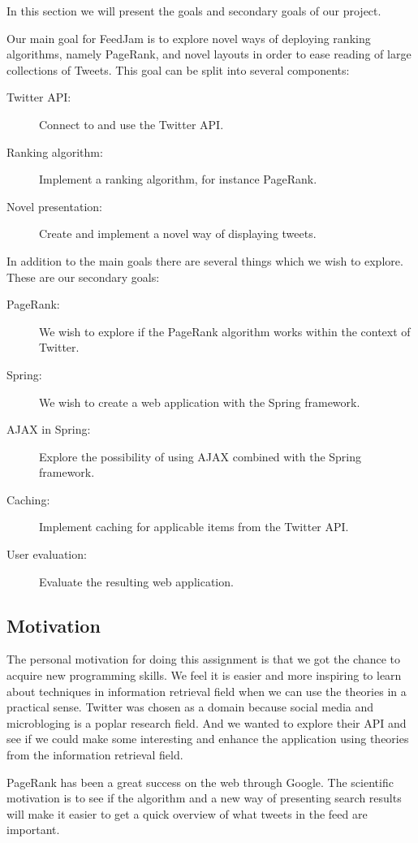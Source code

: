 In this section we will present the goals and secondary goals of our project.

Our main goal for FeedJam is to explore novel ways of deploying ranking algorithms, namely PageRank, and novel layouts in order to ease reading of large collections of Tweets. This goal can be split into several components:

\begin{description}
  \item[Twitter API:] Connect to and use the Twitter API.
  \item[Ranking algorithm:] Implement a ranking algorithm, for instance PageRank.
  \item[Novel presentation:] Create and implement a novel way of displaying tweets.
\end{description}

In addition to the main goals there are several things which we wish to explore. These are our secondary goals:

\begin{description}
  \item[PageRank:] We wish to explore if the PageRank algorithm works within the context of Twitter.
  \item[Spring:] We wish to create a web application with the Spring framework.
  \item[AJAX in Spring:] Explore the possibility of using AJAX combined with the Spring framework.
  \item[Caching:] Implement caching for applicable items from the Twitter API.
  \item[User evaluation:] Evaluate the resulting web application.
\end{description}

\subsection{Motivation} %
The personal motivation for doing this assignment is that we got the chance to acquire new programming skills. We feel it is easier and more inspiring to learn about techniques in information retrieval field when we can use the theories in a practical sense. Twitter was chosen as a domain because social media and microbloging is a poplar research field. And we wanted to explore their API and see if we could make some interesting and enhance the application using theories from the information retrieval field. 

PageRank has been a great success on the web through Google. The scientific motivation is to see if the algorithm and a new way of presenting search results will make it easier to get a quick overview of what tweets in the feed are important.


